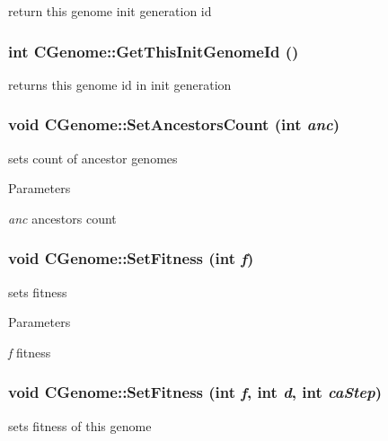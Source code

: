\label{classCGenome_a924b1fddb5b0941f38b1eb51da608c3c}
return this genome init generation id \hypertarget{classCGenome_a5dfa049008c6240a85fa18c99da636d0}{
\subsubsection[{GetThisInitGenomeId}]{\setlength{\rightskip}{0pt plus 5cm}int CGenome::GetThisInitGenomeId ()}}
\label{classCGenome_a5dfa049008c6240a85fa18c99da636d0}
returns this genome id in init generation \hypertarget{classCGenome_afe3b0fd006996c7cd4e004a64f148fa9}{
\subsubsection[{SetAncestorsCount}]{\setlength{\rightskip}{0pt plus 5cm}void CGenome::SetAncestorsCount (int {\em anc})}}
\label{classCGenome_afe3b0fd006996c7cd4e004a64f148fa9}
sets count of ancestor genomes


\begin{DoxyParams}{Parameters}
\item[{\em anc}]ancestors count \end{DoxyParams}
\hypertarget{classCGenome_acd37f114e0f35ce1e9fc6aaeeb1e7906}{
\subsubsection[{SetFitness}]{\setlength{\rightskip}{0pt plus 5cm}void CGenome::SetFitness (int {\em f})}}
\label{classCGenome_acd37f114e0f35ce1e9fc6aaeeb1e7906}
sets fitness


\begin{DoxyParams}{Parameters}
\item[{\em f}]fitness \end{DoxyParams}
\hypertarget{classCGenome_a55e277b9ac07a547125764452d9955e6}{
\subsubsection[{SetFitness}]{\setlength{\rightskip}{0pt plus 5cm}void CGenome::SetFitness (int {\em f}, \/  int {\em d}, \/  int {\em caStep})}}
\label{classCGenome_a55e277b9ac07a547125764452d9955e6}
sets fitness of this genome


